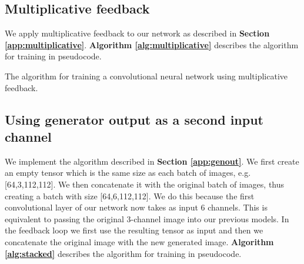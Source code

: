 \documentclass{l4proj}
\begin{document}
\subsection{Multiplicative feedback}
\label{implmult}
We apply multiplicative feedback to our network as described in \textbf{Section {\ref{app:multiplicative}}}.
\textbf{Algorithm \ref{alg:multiplicative}} describes the algorithm for training in pseudocode.

\begin{algorithm}
    \DontPrintSemicolon
    
\caption{The algorithm for training a convolutional neural network using multiplicative feedback. }\label{alg:multiplicative}
\end{algorithm}


\subsection{Using generator output as a second input channel}
\label{impl:genoutput}

We implement the algorithm described in \textbf{Section \ref{app:genout}}. We first create an empty tensor which is the same size as each batch of images, e.g. [64,3,112,112]. We then concatenate it with the original batch of images, thus creating a batch with size [64,6,112,112]. We do this because the first convolutional layer of our network now takes as input 6 channels. This is equivalent to passing the original 3-channel image into our previous models. In the feedback loop we first use the resulting tensor as input and then we concatenate the original image with the new generated image. \textbf{Algorithm \ref{alg:stacked}} describes the algorithm for training in pseudocode.
\end{document}
